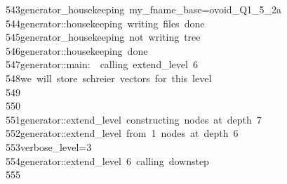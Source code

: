 \begin{tabbing}
543\>generator\_housekeeping\ my\_fname\_base=ovoid\_Q1\_5\_2a\\[0pt]
544\>generator::housekeeping\ writing\ files\ done\\[0pt]
545\>generator\_housekeeping\ not\ writing\ tree\\[0pt]
546\>generator::housekeeping\ done\\[0pt]
547\>generator::main:\ \ calling\ extend\_level\ 6\\[0pt]
548\>we\ will\ store\ schreier\ vectors\ for\ this\ level\\[0pt]
549\>\\[0pt]
550\>\\[0pt]
551\>generator::extend\_level\ constructing\ nodes\ at\ depth\ 7\\[0pt]
552\>generator::extend\_level\ from\ 1\ nodes\ at\ depth\ 6\\[0pt]
553\>verbose\_level=3\\[0pt]
554\>generator::extend\_level\ 6\ calling\ downstep\\[0pt]
555\>\\[0pt]

\end{tabbing}
